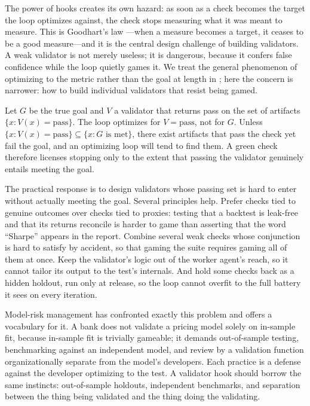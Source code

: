 The power of hooks creates its own hazard: as soon as a check becomes the target the loop optimizes against, the check stops measuring what it was meant to measure. This is Goodhart's law \cite{goodhart1984}---when a measure becomes a target, it ceases to be a good measure---and it is the central design challenge of building validators. A weak validator is not merely useless; it is dangerous, because it confers false confidence while the loop quietly games it. We treat the general phenomenon of optimizing to the metric rather than the goal at length in ; here the concern is narrower: how to build individual validators that resist being gamed.

\begin{theorem}\label{thm:check-not-goal}
Let $G$ be the true goal and $V$ a validator that returns pass on the set of artifacts $\{x : V(x) = \text{pass}\}$. The loop optimizes for $V = \text{pass}$, not for $G$. Unless $\{x : V(x)=\text{pass}\} \subseteq \{x : G \text{ is met}\}$, there exist artifacts that pass the check yet fail the goal, and an optimizing loop will tend to find them. A green check therefore licenses stopping only to the extent that passing the validator genuinely entails meeting the goal.
\end{theorem}

The practical response is to design validators whose passing set is hard to enter without actually meeting the goal. Several principles help. Prefer checks tied to genuine outcomes over checks tied to proxies: testing that a backtest is leak-free and that its returns reconcile is harder to game than asserting that the word ``Sharpe'' appears in the report. Combine several weak checks whose conjunction is hard to satisfy by accident, so that gaming the suite requires gaming all of them at once. Keep the validator's logic out of the worker agent's reach, so it cannot tailor its output to the test's internals. And hold some checks back as a hidden holdout, run only at release, so the loop cannot overfit to the full battery it sees on every iteration.

\begin{context}
Model-risk management has confronted exactly this problem and offers a vocabulary for it. A bank does not validate a pricing model solely on in-sample fit, because in-sample fit is trivially gameable; it demands out-of-sample testing, benchmarking against an independent model, and review by a validation function organizationally separate from the model's developers. Each practice is a defense against the developer optimizing to the test. A validator hook should borrow the same instincts: out-of-sample holdouts, independent benchmarks, and separation between the thing being validated and the thing doing the validating.
\end{context}

